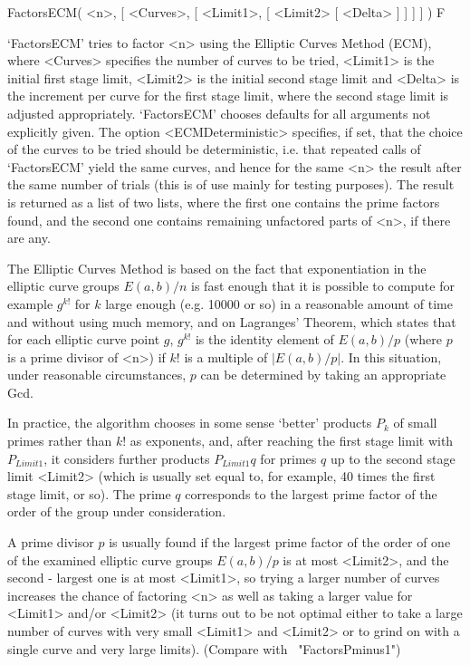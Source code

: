 \>FactorsECM( <n>, [ <Curves>, [ <Limit1>, [ <Limit2> [ <Delta> ] ] ] ] ) F

`FactorsECM' tries to factor <n> using the Elliptic Curves Method (ECM),
where <Curves> specifies the number of curves to be tried,
<Limit1> is the initial first stage limit,
<Limit2> is the initial second stage limit and
<Delta> is the increment per curve for the first stage limit, where
the second stage limit is adjusted appropriately. 
`FactorsECM' chooses defaults for all arguments not explicitly given.
The option <ECMDeterministic> specifies,
if set, that the choice of the curves to be tried should be 
deterministic, i.e. that repeated calls of `FactorsECM' yield 
the same curves, and hence for the same <n> the result after the same
number of trials (this is of use mainly for testing purposes).
The result is returned as a list of two lists, where the first one 
contains the prime factors found, and the second one contains
remaining unfactored parts of <n>, if there are any.

The Elliptic Curves Method is based on the fact that exponentiation
in the elliptic curve groups 
$E(a,b)/n$ is fast enough
that it is possible to compute for example $g^{k!}$ for $k$ large enough 
(e.g. 10000 or so) in a reasonable amount of time and without
using much memory, and on Lagranges' Theorem, 
which states that for each
elliptic curve point $g$,
$g^{k!}$ is the identity element of $E(a,b)/p$ (where $p$ is a prime
divisor of <n>) if $k!$ is a multiple of $|E(a,b)/p|$.
In this situation, under reasonable circumstances, $p$ can be
determined by taking an appropriate Gcd.

In practice, the algorithm chooses in some sense \lq better'
products $P_k$ of small primes rather than $k!$ as exponents, and,
after reaching the first stage limit with $P_{Limit1}$, it
considers further products $P_{Limit1}q$ for primes $q$ up to
the second stage limit <Limit2> (which is usually set equal to, 
for example, 40 times the first stage limit, or so).
The prime $q$ corresponds to the largest prime factor of the
order of the group under consideration.

A prime divisor $p$ is usually found if the largest prime factor
of the order of one of the examined elliptic curve groups $E(a,b)/p$ 
is at most <Limit2>, and the second - largest one is at most <Limit1>,
so trying a larger number of curves increases the chance of
factoring <n> as well as taking a larger value
for <Limit1> and/or <Limit2> (it turns out to be not optimal either to
take a large number of curves with very small <Limit1> and <Limit2> 
or to grind on with a single curve and very large limits).
(Compare with ~"FactorsPminus1")

